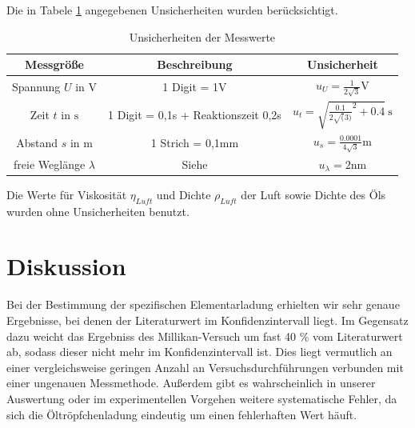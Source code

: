 \documentclass[11pt, a4paper]{article}
\begin{document}
    Die in Tabele \ref{unsichmili} angegebenen Unsicherheiten wurden berücksichtigt.
    \begin{table}
        \begin{tabular}{c | c | c}
            Messgröße & Beschreibung & Unsicherheit \\ \hline
            Spannung $U$ in $\si{\volt}$ & 1 Digit = 1V & $u_U = \frac{1}{2\sqrt{3}} \si{\volt}$ \\
            Zeit $t$ in $\si{\second}$ & 1 Digit = 0,1s + Reaktionszeit 0,2s & $u_t = \sqrt{\frac{0.1}{2\sqrt(3)}^2 + 0.4} \ \si{\second}$ \\            Abstand $s$ in $\si{\metre}$ & 1 Strich = 0,1mm & $u_s = \frac{0.0001}{4\sqrt{3}} \si{\metre}$ \\
            freie Weglänge $\lambda$ & Siehe \cite{ELE} & $u_\lambda = 2 \si{\nano\metre}$ \\
        \end{tabular}
        \caption{Unsicherheiten der Messwerte}
        \label{unsichmili}
    \end{table}
    Die Werte für Viskosität $\eta_{Luft}$ und Dichte $\rho_{Luft}$ der Luft \cite[]{Luft} sowie Dichte des Öls \cite{ELE} wurden ohne Unsicherheiten benutzt.




    \section{Diskussion}
    Bei der Bestimmung der spezifischen Elementarladung erhielten wir sehr genaue Ergebnisse, bei denen der Literaturwert im Konfidenzintervall liegt. Im Gegensatz dazu weicht das Ergebniss des Millikan-Versuch um fast 40 \% vom Literaturwert ab, sodass dieser nicht mehr im Konfidenzintervall ist.
    Dies liegt vermutlich an einer vergleichsweise geringen Anzahl an Versuchsdurchführungen verbunden mit einer ungenauen Messmethode. Außerdem gibt es wahrscheinlich in unserer Auswertung oder im experimentellen Vorgehen weitere systematische Fehler, da sich die Öltröpfchenladung eindeutig um einen fehlerhaften Wert häuft.
    

    
    
\end{document}
